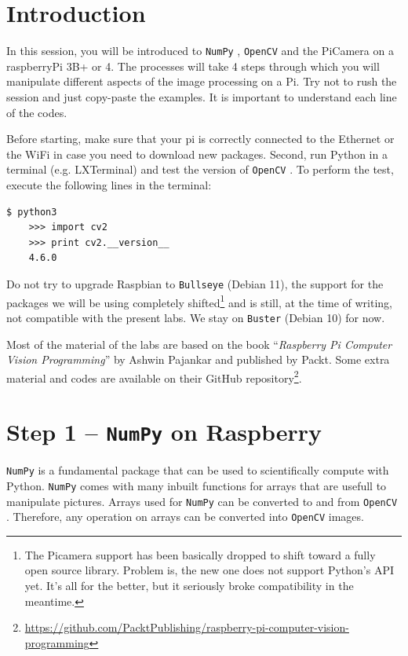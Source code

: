 \documentclass{labo}
\author{}
\newcommand{\numpy}{\texttt{NumPy} }
\newcommand{\opencv}{\texttt{OpenCV} }
\begin{document}

\section*{Introduction}
In this session, you will be introduced to \numpy, \opencv and the PiCamera on a raspberryPi 3B+ or 4. The processes will take 4 steps through which you will manipulate different aspects of the image processing on a Pi. Try not to rush the session and just copy-paste the examples. It is important to understand each line of the codes.

Before starting, make sure that your pi is correctly connected to the Ethernet or the WiFi in case you need to download new packages.
Second, run Python in a terminal (e.g. LXTerminal) and test the version of \opencv. To perform the test, execute the following lines in the terminal:

\begin{verbatim}
$ python3
	>>> import cv2
	>>> print cv2.__version__
	4.6.0
\end{verbatim}

Do not try to upgrade Raspbian to \texttt{Bullseye} (Debian 11), the support for the packages we will be using completely shifted\footnote{The Picamera support has been basically dropped to shift toward a fully open source library. Problem is, the new one does not support Python's API yet. It's all for the better, but it seriously broke compatibility in the meantime.} and is still, at the time of writing, not compatible with the present labs. We stay on \texttt{Buster} (Debian 10) for now.

Most of the material of the labs are based on the book ``\textit{Raspberry Pi Computer Vision Programming}'' by Ashwin Pajankar and published by Packt. Some extra material and codes are available on their GitHub repository\footnote{\url{https://github.com/PacktPublishing/raspberry-pi-computer-vision-programming}}.


\section*{Step 1 -- \texttt{NumPy} on Raspberry}
\numpy is a fundamental package that can be used to scientifically compute with Python. \numpy comes with many inbuilt functions for arrays that are usefull to manipulate pictures. Arrays used for \numpy can be converted to and from \opencv. Therefore, any operation on arrays can be converted into \opencv images.
\end{document}
